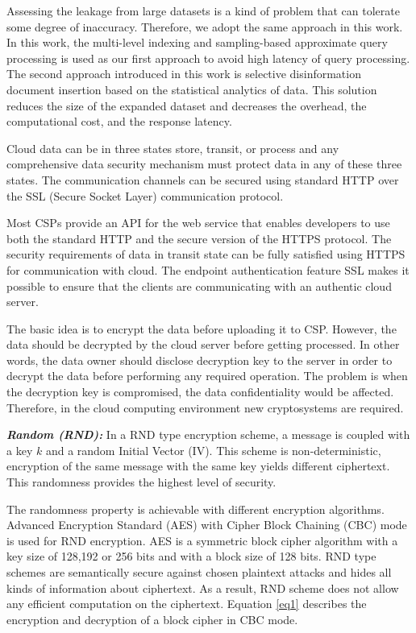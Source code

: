 Assessing the leakage from large datasets is a kind of problem that can tolerate some degree of inaccuracy. Therefore, we adopt the same approach in this work. In this work, the multi-level indexing and sampling-based approximate query processing is used as our first approach to avoid high latency of query processing. The second approach introduced in this work is selective disinformation document insertion based on the statistical analytics of data. This solution reduces the size of the expanded dataset and decreases the  overhead, the computational cost, and the response latency. 

\medskip

Cloud data can be in three states store, transit, or process and any comprehensive data security mechanism must protect data in any of these three states. The communication channels can be secured using standard HTTP over the SSL (Secure Socket Layer) communication protocol. 

Most CSPs provide an API for the web service that enables developers to use both the standard HTTP and the secure version of the HTTPS protocol. The security requirements of data in transit state can be fully satisfied using HTTPS for communication with cloud. The endpoint authentication feature  SSL makes it possible to ensure that the clients are communicating with an authentic cloud server.

The basic idea is to encrypt the data before uploading it to CSP. However, the data should be decrypted by the cloud server before getting processed. In other words, the data owner should disclose decryption key to the server in order to decrypt the data before performing any required operation. The problem is when the decryption key is compromised, the data confidentiality would be affected. Therefore, in the cloud computing environment new cryptosystems are required. 

\medskip


\noindent \textbf{\textit{Random (RND):}} In  a RND type encryption scheme, a message is coupled with a key $k$ and a random Initial Vector (IV). This scheme is non-deterministic, encryption of the same message with the same key yields different ciphertext. This randomness provides the highest level of security. 

The randomness property is achievable with different encryption algorithms. Advanced Encryption Standard (AES) with Cipher Block Chaining (CBC) mode is used for RND encryption. AES is a symmetric block cipher algorithm with a key size of 128,192 or 256 bits and with a block size of 128 bits. RND type schemes are semantically secure against chosen plaintext attacks and hides all kinds of information about ciphertext. As a result, RND scheme does not allow any efficient computation on the ciphertext. Equation \ref{eq1} describes the encryption and decryption of a block cipher in CBC mode.


